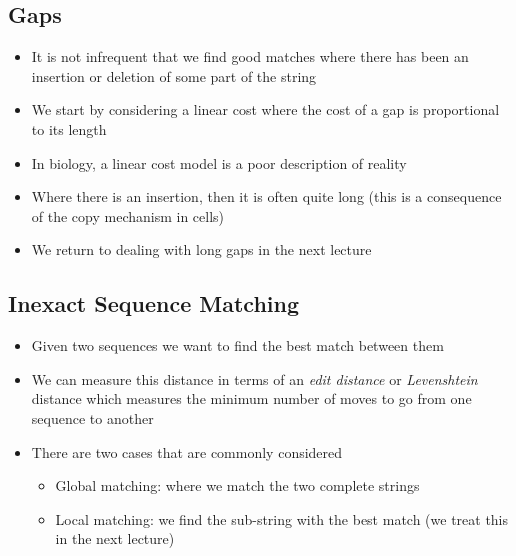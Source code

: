 \begin{slide}
\section{Gaps}

\begin{PauseHighLight}
  \begin{itemize}
  \item It is not infrequent that we find good matches where there has
    been an insertion or deletion of some part of the string\pause
  \item We start by considering a linear cost where the cost of a gap is
    proportional to its length\pause
  \item In biology, a linear cost model is a poor description of
    reality\pause
  \item Where there is an insertion, then it is often quite long (this
    is a consequence of the copy mechanism in cells)\pause
  \item We return to dealing with long gaps in the next lecture\pause
  \end{itemize}
\end{PauseHighLight}

\end{slide}


\begin{slide}
\section{Inexact Sequence Matching}

\begin{PauseHighLight}
  \begin{itemize}
  \item Given two sequences we want to find the best match between
    them\pause
  \item We can measure this distance in terms of an \emph{edit
      distance} or \emph{Levenshtein} distance which measures the
    minimum number of moves to go from one sequence to another\pause
  \item There are two cases that are commonly considered
    \begin{itemize}
    \item Global matching: where we match the two complete strings\pause
    \item Local matching: we find the sub-string with the best match (we
      treat this in the next lecture)\pause
    \end{itemize}
  \end{itemize}
\end{PauseHighLight}

\end{slide}


